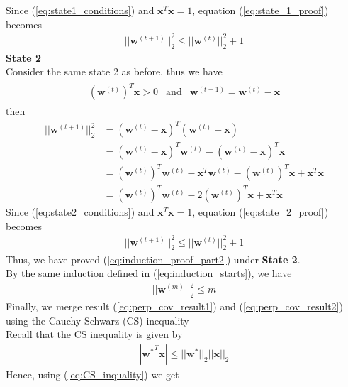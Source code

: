 Since (\ref{eq:state1_conditions}) and $\textbf{x}^T\textbf{x} = 1$, equation (\ref{eq:state_1_proof}) becomes
\begin{align}
  ||{\textbf{w}^{(t+1)}}||_{2}^{2} \leq ||{\textbf{w}^{(t)}}||_{2}^{2} + 1
\end{align}
\indent \textbf{State 2} \\
Consider the same state 2 as before, thus we have
\begin{align}
  \begin{matrix}
    \label{eq:state2_conditions}
    (\textbf{w}^ {(t)})^T\textbf{x} > 0 & \text{and} & \textbf{w}^ {(t+1)} = \textbf{w}^{(t)} - \textbf{x}
  \end{matrix}
\end{align}
then
\begin{align}
  \nonumber
  ||\textbf{w}^{(t+1)}||_{2}^{2} &= ( \textbf{w}^{(t)} - \textbf{x})^T( \textbf{w}^{(t)} - \textbf{x}) \\
  \nonumber
  &=( \textbf{w}^{(t)} - \textbf{x})^T\textbf{w}^{(t)} - ( \textbf{w}^{(t)} - \textbf{x})^T\textbf{x} \\
  \nonumber
  &= (\textbf{w}^{(t)})^T\textbf{w}^{(t)} - \textbf{x}^T\textbf{w}^{(t)} - (\textbf{w}^{(t)})^T\textbf{x} + \textbf{x}^T\textbf{x}\\
  &= (\textbf{w}^{(t)})^T\textbf{w}^{(t)} - 2 (\textbf{w}^{(t)})^T\textbf{x}  + \textbf{x}^T\textbf{x}
  \label{eq:state_2_proof}
\end{align}
Since (\ref{eq:state2_conditions}) and $\textbf{x}^T\textbf{x} = 1$, equation (\ref{eq:state_2_proof}) becomes
\begin{align}
  ||{\textbf{w}^{(t+1)}}||_{2}^{2} \leq ||{\textbf{w}^{(t)}}||_{2}^{2} + 1
\end{align}
Thus, we have proved (\ref{eq:induction_proof_part2}) under \textbf{State 2}.\\
By the same induction defined in (\ref{eq:induction_starts}), we have
\begin{align}
  \label{eq:perp_cov_result2}
  ||\textbf{w}^{(m)}||_{2}^{2} \leq m
\end{align}
Finally, we merge result (\ref{eq:perp_cov_result1}) and (\ref{eq:perp_cov_result2}) using the Cauchy-Schwarz (CS) inequality \\
Recall that the CS inequality is given by
\begin{align}
  \label{eq:CS_inquality}
  |{\textbf{w}^*}^T\textbf{x}| \leq ||\textbf{w}^{*}||_2 ||\textbf{x}||_2
\end{align}
Hence, using (\ref{eq:CS_inquality}) we get
